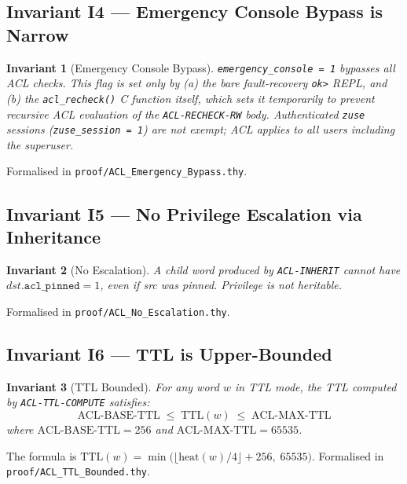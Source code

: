 \documentclass[11pt,letterpaper,openany]{article}
\newtheorem{invariant}{Invariant}
\newcommand{\acl}[1]{\texttt{#1}}
\begin{document}
\subsection{Invariant I4 — Emergency Console Bypass is Narrow}

\begin{invariant}[Emergency Console Bypass]
\label{inv:ec}
\texttt{emergency\_console = 1} bypasses all ACL checks.  This flag is
set \emph{only} by (a) the bare fault-recovery \texttt{ok>} REPL, and
(b) the \texttt{acl\_recheck()} C function itself, which sets it
temporarily to prevent recursive ACL evaluation of the
\acl{ACL-RECHECK-RW} body.  Authenticated \texttt{zuse} sessions
(\texttt{zuse\_session = 1}) are \emph{not} exempt; ACL applies to
all users including the superuser.
\end{invariant}

\noindent
Formalised in \texttt{proof/ACL\_Emergency\_Bypass.thy}.

\subsection{Invariant I5 — No Privilege Escalation via Inheritance}

\begin{invariant}[No Escalation]
\label{inv:noescalate}
A child word produced by \acl{ACL-INHERIT} cannot have
$\textit{dst}.\texttt{acl\_pinned} = 1$, even if \textit{src} was
pinned.  Privilege is not heritable.
\end{invariant}

\noindent
Formalised in \texttt{proof/ACL\_No\_Escalation.thy}.

\subsection{Invariant I6 — TTL is Upper-Bounded}

\begin{invariant}[TTL Bounded]
\label{inv:ttlbound}
For any word $w$ in TTL mode, the TTL computed by \acl{ACL-TTL-COMPUTE}
satisfies:
\[
\text{ACL-BASE-TTL} \;\leq\; \text{TTL}(w) \;\leq\; \text{ACL-MAX-TTL}
\]
where $\text{ACL-BASE-TTL} = 256$ and $\text{ACL-MAX-TTL} = 65535$.
\end{invariant}

\noindent
The formula is $\text{TTL}(w) = \min\!\bigl(\lfloor
\text{heat}(w)/4 \rfloor + 256,\; 65535\bigr)$.  Formalised in
\texttt{proof/ACL\_TTL\_Bounded.thy}.

\end{document}
